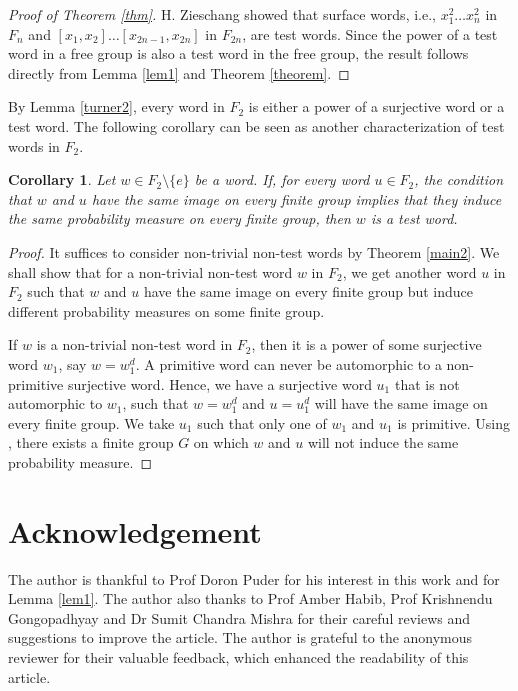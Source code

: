 \documentclass[12pt]{amsart}
\newtheorem{cor}[theorem]{Corollary}
\begin{document}
\begin{proof}[Proof of Theorem \ref{thm}]
    H. Zieschang \cite{zieschang1966automorphismen} showed that surface words, i.e., $x_1^2\ldots x_n^2$ in $F_n$ and $[x_1,x_2]\ldots [x_{2n-1},x_{2n}]$ in $F_{2n}$, are test words. Since the power of a test word in a free group is also a test word in the free group, the result follows directly from Lemma \ref{lem1} and Theorem \ref{theorem}.
\end{proof}

 By Lemma \ref{turner2}, every word in $F_2$ is either a power of a surjective word or a test word.  The following corollary can be seen as another characterization of test words in $F_2$.

 
\begin{cor}
    Let $w \in F_2 \setminus \{e\}$ be a word. If, for every word $u \in F_2$, the condition that $w$ and $u$ have the same image on every finite group implies that they induce the same probability measure on every finite group, then $w$ is a test word. 
\end{cor}
\begin{proof}
     It suffices to consider non-trivial non-test words by Theorem \ref{main2}. We shall show that for a non-trivial non-test word $w$ in $F_2$, we get another word $u$ in $F_2$ such that $w$ and $u$ have the same image on every finite group but induce different probability measures on some finite group.
     
     If $w$ is a non-trivial non-test word in $F_2$, then it is a power of some surjective word $w_1$, say $w = w_1^d$. A primitive word can never be automorphic to a non-primitive surjective word. Hence, we have a surjective word $u_1$ that is not automorphic to $w_1$, such that $w = w_1^d$ and $u=u_1^d$ will have the same image on every finite group. We take $u_1$ such that only one of $w_1$ and $u_1$ is primitive. Using \cite{hanany2020some}, there exists a finite group $G$ on which $w$ and $u$ will not induce the same probability measure.
\end{proof}
\section*{Acknowledgement}
The author is thankful to Prof Doron Puder for his interest in this work and for Lemma \ref{lem1}. The author also thanks to Prof Amber Habib, Prof Krishnendu Gongopadhyay and Dr Sumit Chandra Mishra for their careful reviews and suggestions to improve the article. The author is grateful to the anonymous reviewer for their valuable feedback, which enhanced the readability of this article.





\end{document}
